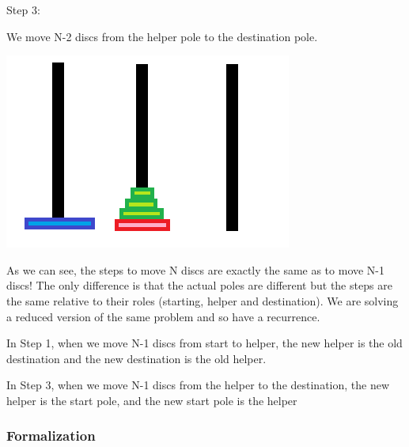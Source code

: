 \documentclass[11pt,oneside]{book}
\makeatletter
\def\maxwidth#1{\ifdim\Gin@nat@width>#1 #1\else\Gin@nat@width\fi}
\makeatother
\begin{document}
Step 3:

We move N-2 discs from the helper pole to the destination pole.

\vspace{5px}\includegraphics[width=\maxwidth{\textwidth}]{hanoi2.png}

As we can see, the steps to move N discs are exactly the same as to move N-1 discs! The only difference is that the actual poles are different but the steps are the same relative to their roles (starting, helper and destination). We are solving a reduced version of the same problem and so have a recurrence.

In Step 1, when we move N-1 discs from start to helper, the new helper is the old destination and the new destination is the old helper.

In Step 3, when we move N-1 discs from the helper to the destination, the new helper is the start pole, and the new start pole is the helper

\subsubsection{Formalization}
\end{document}
